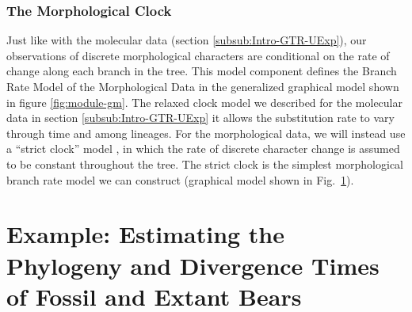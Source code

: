 \subsubsection{The Morphological Clock}\label{subsub:Intro-MorphClock}



Just like with the molecular data (section \ref{subsub:Intro-GTR-UExp}), our observations of discrete morphological characters are conditional on the rate of change along each branch in the tree. 
This model component defines the \textsf{Branch Rate Model} of the \textsf{Morphological Data} in the generalized graphical model shown in figure \ref{fig:module-gm}.
The relaxed clock model we described for the molecular data in section \ref{subsub:Intro-GTR-UExp} it allows the substitution rate to vary through time and among lineages. 
For the morphological data, we will instead use a ``strict clock'' model \citep{Zuckerkandl1962}, in which the rate of discrete character change is assumed to be constant throughout the tree.
The strict clock is the simplest morphological branch rate model we can construct (graphical model shown in Fig.\ \ref{fig:morph_clock_gm}).
\begin{figure}[h!]
\label{fig:morph_clock_gm}
\end{figure} 


\newpage
\section{Example: Estimating the Phylogeny and Divergence Times of Fossil and Extant Bears}\label{sect:Exercise}

